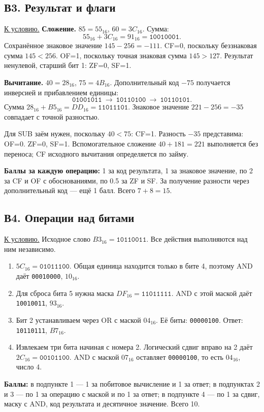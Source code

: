 \subsection*{В3. Результат и флаги}\label{sol:v3}
\hyperref[task:v3]{К условию.}
\textbf{Сложение.} $85=55_{16}$, $60=3C_{16}$. Сумма:
\[
55_{16}+3C_{16}=91_{16}=\texttt{10010001}.
\]
Сохранённое знаковое значение $145-256=-111$. CF=0, поскольку беззнаковая сумма $145<256$. OF=1, поскольку точная знаковая сумма $145>127$. Результат ненулевой, старший бит 1: ZF=0, SF=1.

\textbf{Вычитание.} $40=28_{16}$, $75=4B_{16}$. Дополнительный код $-75$ получается инверсией и прибавлением единицы:
\[
\texttt{01001011}\ \longrightarrow\ \texttt{10110100}
\ \longrightarrow\ \texttt{10110101}.
\]
Сумма $28_{16}+B5_{16}=DD_{16}=\texttt{11011101}$. Знаковое значение $221-256=-35$ совпадает с точной разностью.

Для SUB заём нужен, поскольку $40<75$: CF=1. Разность $-35$ представима: OF=0. ZF=0, SF=1. Вспомогательное сложение $40+181=221$ выполняется без переноса; CF исходного вычитания определяется по займу.

\textbf{Баллы за каждую операцию:} 1 за код результата, 1 за знаковое значение, по 2 за CF и OF с обоснованиями, по 0.5 за ZF и SF. За получение разности через дополнительный код --- ещё 1 балл. Всего $7+8=15$.

\subsection*{В4. Операции над битами}\label{sol:v4}
\hyperref[task:v4]{К условию.}
Исходное слово $B3_{16}=\texttt{10110011}$. Все действия выполняются над ним независимо.
\begin{enumerate}
    \item $5C_{16}=\texttt{01011100}$. Общая единица находится только в бите 4, поэтому AND даёт \texttt{00010000}, $10_{16}$.
    \item Для сброса бита 5 нужна маска $DF_{16}=\texttt{11011111}$. AND с этой маской даёт \texttt{10010011}, $93_{16}$.
    \item Бит 2 устанавливаем через OR с маской $04_{16}$. Её биты: \texttt{00000100}. Ответ: \texttt{10110111}, $B7_{16}$.
    \item Извлекаем три бита начиная с номера 2. Логический сдвиг вправо на 2 даёт $2C_{16}=\texttt{00101100}$. AND с маской $07_{16}$ оставляет \texttt{00000100}, то есть $04_{16}$, число 4.
\end{enumerate}
\textbf{Баллы:} в подпункте 1 --- 1 за побитовое вычисление и 1 за ответ; в подпунктах 2 и 3 --- по 1 за операцию с маской и по 1 за ответ; в подпункте 4 --- по 1 за сдвиг, маску с AND, код результата и десятичное значение. Всего 10.

